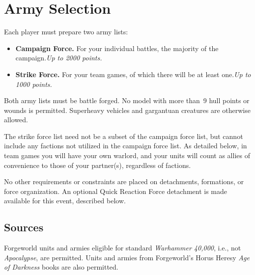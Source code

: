 %

\makeatletter\@openrightfalse
\chapter{Army Selection}
\@openrighttrue\makeatother

Each player must prepare two army lists:

\begin{itemize}
\item \textbf{Campaign Force.} For your individual battles, the
  majority of the campaign.\hfill\textit{Up to 2000 points.}

\item \textbf{Strike Force.} For your team games, of which there will
  be at least one.\hfill\textit{Up to 1000 points.}
\end{itemize}

Both army lists must be battle forged.  No model with more than~9 hull
points or wounds is permitted.  Superheavy vehicles and gargantuan
creatures are otherwise allowed.

The strike force list need not be a subset of the campaign force list,
but cannot include any factions not utilized in the campaign force
list.  As detailed below, in team games you will have your own
warlord, and your units will count as allies of convenience to those
of your partner(s), regardless of factions.

No other requirements or constraints are placed on detachments,
formations, or force organization. An optional Quick Reaction Force
detachment is made available for this event, described below.

\section{Sources}

Forgeworld units and armies eligible for standard \textit{Warhammer
  40,000}, i.e., not \textit{Apocalypse}, are permitted. Units and
armies from Forgeworld's Horus Heresy \textit{Age of Darkness} books
are also permitted.

